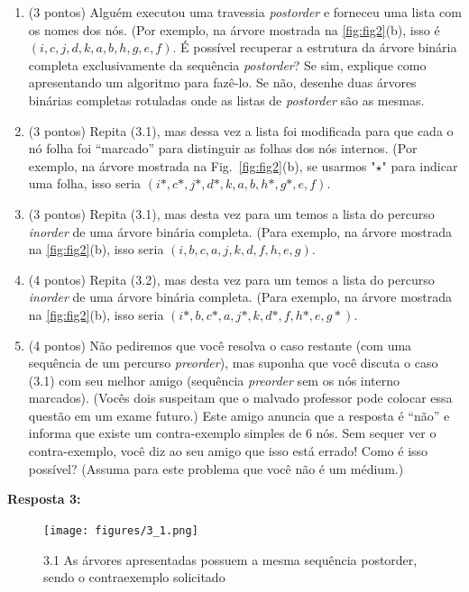 \documentclass{article}
\begin{document}
\begin{enumerate}[label*=3.\arabic*.]
    \item (3 pontos) Alguém executou uma travessia \textit{postorder} e forneceu uma lista com os nomes dos nós. (Por exemplo, na árvore mostrada na \autoref{fig:fig2}(b), isso é $(i, c, j, d, k, a, b, h, g, e, f)$. É possível recuperar a estrutura da árvore binária completa exclusivamente da sequência \textit{postorder}? Se sim, explique como apresentando um algoritmo para fazê-lo. Se não, desenhe duas árvores binárias completas rotuladas onde as listas de \textit{postorder} são as mesmas.
    \item (3 pontos) Repita (3.1), mas dessa vez a lista foi modificada para que cada o nó folha foi “marcado” para distinguir as folhas dos nós internos. (Por exemplo, na árvore mostrada na Fig.~\ref{fig:fig2}(b), se usarmos "$\star$" para indicar uma folha, isso seria $(i*, c*, j*, d*, k, a, b, h*, g*, e, f)$.
    \item (3 pontos) Repita (3.1), mas desta vez para um temos a lista do percurso \textit{inorder} de uma árvore binária completa. (Para exemplo, na árvore mostrada na \autoref{fig:fig2}(b), isso seria $(i, b, c, a, j, k, d, f, h, e, g)$.
    \item (4 pontos) Repita (3.2), mas desta vez para um temos a lista do percurso \textit{inorder} de uma árvore binária completa. (Para exemplo, na árvore mostrada na \autoref{fig:fig2}(b), isso seria $(i*, b, c*, a, j*, k, d*, f, h*, e, g*)$. 
    \item (4 pontos) Não pediremos que você resolva o caso restante (com uma sequência de um percurso \textit{preorder}), mas suponha que você discuta o caso (3.1) com seu melhor amigo (sequência \textit{preorder} sem os nós interno marcados). (Vocês dois suspeitam que o malvado professor pode colocar essa questão em um exame futuro.) Este amigo anuncia que a resposta é “não” e informa que existe um contra-exemplo simples de 6 nós. Sem sequer ver o contra-exemplo, você diz ao seu amigo que isso está errado! Como é isso possível? (Assuma para este problema que você não é um médium.)
\end{enumerate}

\textbf{Resposta 3:}

\begin{figure}[!h]
  \centering
    \texttt{[image: figures/3\_1.png]}
    \caption{3.1 As árvores apresentadas possuem a mesma sequência postorder, sendo o contraexemplo solicitado}
  \label{fig:resp1_1}
\end{figure}
\end{document}
